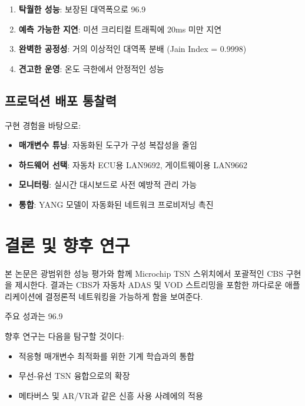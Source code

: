 \documentclass[twocolumn,10pt]{article}
\begin{document}
\begin{enumerate}
    \item \textbf{탁월한 성능}: 보장된 대역폭으로 96.9%
    \item \textbf{예측 가능한 지연}: 미션 크리티컬 트래픽에 20ms 미만 지연
    \item \textbf{완벽한 공정성}: 거의 이상적인 대역폭 분배 (Jain Index = 0.9998)
    \item \textbf{견고한 운영}: 온도 극한에서 안정적인 성능
\end{enumerate}

\subsection{프로덕션 배포 통찰력}

구현 경험을 바탕으로:

\begin{itemize}
    \item \textbf{매개변수 튜닝}: 자동화된 도구가 구성 복잡성을 줄임
    \item \textbf{하드웨어 선택}: 자동차 ECU용 LAN9692, 게이트웨이용 LAN9662
    \item \textbf{모니터링}: 실시간 대시보드로 사전 예방적 관리 가능
    \item \textbf{통합}: YANG 모델이 자동화된 네트워크 프로비저닝 촉진
\end{itemize}

\section{결론 및 향후 연구}

본 논문은 광범위한 성능 평가와 함께 Microchip TSN 스위치에서 포괄적인 CBS 구현을 제시한다. 결과는 CBS가 자동차 ADAS 및 VOD 스트리밍을 포함한 까다로운 애플리케이션에 결정론적 네트워킹을 가능하게 함을 보여준다.

주요 성과는 96.9%

향후 연구는 다음을 탐구할 것이다:
\begin{itemize}
    \item 적응형 매개변수 최적화를 위한 기계 학습과의 통합
    \item 무선-유선 TSN 융합으로의 확장
    \item 메타버스 및 AR/VR과 같은 신흥 사용 사례에의 적용
\end{itemize}
\end{document}
